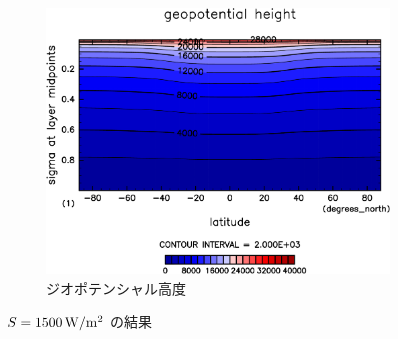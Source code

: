 \documentclass[body]{subfiles}
\begin{document}
\begin{figure}[t]
\begin{subfigure}{.4\textwidth}
		\includegraphics[width=\columnwidth]{S1500/Height,time=3650:4015-crop-rotate.pdf}
		\caption{ジオポテンシャル高度}
	\end{subfigure}
	\caption{
		\(S=1500\hmu{W/m^2}\) の結果
	}
\end{figure}
\end{document}
